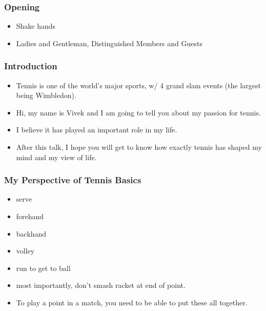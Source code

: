 \begin{frame}
\frametitle{Opening}
\begin{itemize}
\item Shake hands
\item Ladies and Gentleman, Distinguished Members and Guests
\end{itemize}
\end{frame}

\begin{frame}
\frametitle{Introduction}
\begin{itemize}
\item \small Tennis is one of the world's major sports, w/ 4 grand
  slam events (the largest being Wimbledon).
\item \small Hi, my name is Vivek and  I am going to tell you about my passion for tennis.
\item \small I believe it has played an important role in my life.
\item \small After this talk, I hope you will get to know how exactly tennis has shaped my mind and my view of life.
\end{itemize}
\end{frame}

\begin{frame}
\frametitle{My Perspective of Tennis Basics}
\begin{itemize}
\item \small serve
\item \small forehand
\item \small backhand
\item \small volley
\item \small run to get to ball
\item \small most importantly, don't smash racket at end of point.
\item \small To play a point in a match, you need to be able to put these all together.  \\
\end{itemize}
\end{frame}

